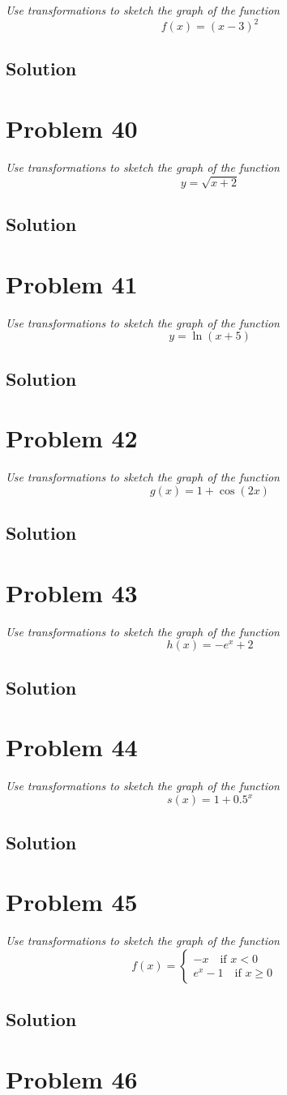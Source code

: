 \documentclass[11pt]{article}
\newcommand{\soln}{\subsection*}
\newcommand{\qn}{\textit}
\newcommand{\eqtext}[1]{\quad\text{#1}\quad}
\begin{document}
\qn{Use transformations to sketch the graph of the function $$f(x)=(x-3)^2$$}
\soln{Solution}

\section*{Problem 40}

\qn{Use transformations to sketch the graph of the function $$y=\sqrt{x+2}$$}
\soln{Solution}

\section*{Problem 41}

\qn{Use transformations to sketch the graph of the function $$y=\ln(x+5)$$}
\soln{Solution}

\section*{Problem 42}

\qn{Use transformations to sketch the graph of the function $$g(x)=1+\cos(2x)$$}
\soln{Solution}

\section*{Problem 43}

\qn{Use transformations to sketch the graph of the function $$h(x)=-e^x+2$$}
\soln{Solution}

\section*{Problem 44}

\qn{Use transformations to sketch the graph of the function $$s(x)=1+0.5^x$$}
\soln{Solution}

\section*{Problem 45}

\qn{Use transformations to sketch the graph of the function $$f(x)=\begin{cases} -x \eqtext{if $x<0$} \\ e^x-1 \eqtext{if $x \ge 0$} \end{cases}$$}
\soln{Solution}

\section*{Problem 46}
\end{document}
